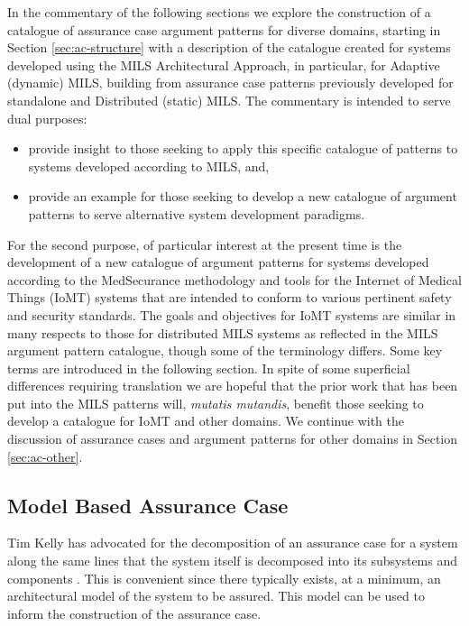 \documentclass[12pt,twoside,a4paper]{article}
\begin{document}
In the commentary of the following sections we explore the construction of a catalogue of assurance case argument patterns for diverse domains, starting in Section \ref{sec:ac-structure} with a description of the catalogue created for systems developed using the MILS Architectural Approach\cite{Vanfleet05,AlvesFoss-etal:MILS06,MILS-CI,Rushby08:MILS-Constitution}, in particular, for Adaptive (dynamic) MILS, building from assurance case patterns previously developed for standalone and Distributed (static) MILS. The commentary is intended to serve dual purposes:
\begin{itemize}
	\item provide insight to those seeking to apply this specific catalogue of patterns to systems developed according to MILS, and,
	\item provide an example for those seeking to develop a new catalogue of argument patterns to serve alternative system development paradigms.
\end{itemize}
For the second purpose, of particular interest at the present time is the development of a new catalogue of argument patterns for systems developed according to the MedSecurance methodology \cite{MedSecurance-WWW} and tools for the Internet of Medical Things (IoMT) systems that are intended to conform to various pertinent safety and security standards.
The goals and objectives for IoMT systems are similar in many respects to those for distributed MILS systems as reflected in the MILS argument pattern catalogue, though some of the terminology differs. Some key terms are introduced in the following section.
In spite of some superficial differences requiring translation we are hopeful that the prior work that has been put into the MILS patterns will, \emph{mutatis mutandis}, benefit those seeking to develop a catalogue for IoMT and other domains.
We continue with the discussion of assurance cases and argument patterns for other domains in Section \ref{sec:ac-other}.

\subsection{Model Based Assurance Case} \label{sec:modelbasedassurancecase}
Tim Kelly has advocated for the decomposition of an assurance case for a system along the same lines that the system itself is decomposed into its subsystems and components \cite{bate-kelly03arch}.
This is convenient since there typically exists, at a minimum, an architectural model of the system to be assured.
This model can be used to inform the construction of the assurance case.
\end{document}
